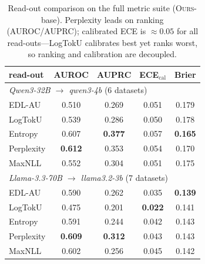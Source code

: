 \documentclass[11pt]{article}
\newcommand{\ours}{\textsc{Ours}}
\newcommand{\best}[1]{\textbf{#1}}
\begin{document}
\begin{table}[t]\centering\small
\setlength{\tabcolsep}{4pt}
\begin{tabular}{l cccc}
\toprule
read-out & AUROC & AUPRC & ECE$_{\text{cal}}$ & Brier\\
\midrule
\multicolumn{5}{l}{\emph{Qwen3-32B $\to$ qwen3-4b} (6 datasets)}\\
EDL-AU     & 0.510 & 0.269 & 0.051 & 0.179\\
LogTokU    & 0.539 & 0.286 & 0.050 & 0.178\\
Entropy    & 0.607 & \best{0.377} & 0.057 & \best{0.165}\\
Perplexity & \best{0.612} & 0.353 & 0.054 & 0.170\\
MaxNLL     & 0.552 & 0.304 & 0.051 & 0.175\\
\midrule
\multicolumn{5}{l}{\emph{Llama-3.3-70B $\to$ llama3.2-3b} (7 datasets)}\\
EDL-AU     & 0.590 & 0.262 & 0.035 & \best{0.139}\\
LogTokU    & 0.475 & 0.201 & \best{0.022} & 0.141\\
Entropy    & 0.591 & 0.244 & 0.042 & 0.143\\
Perplexity & \best{0.609} & \best{0.312} & 0.043 & 0.143\\
MaxNLL     & 0.602 & 0.256 & 0.045 & 0.142\\
\bottomrule
\end{tabular}
\caption{Read-out comparison on the full metric suite (\ours-base). Perplexity leads on
ranking (AUROC/AUPRC); calibrated ECE is $\approx0.05$ for all read-outs---LogTokU
calibrates best yet ranks worst, so ranking and calibration are decoupled.}
\label{tab:app-multimetric}
\end{table}
\end{document}
